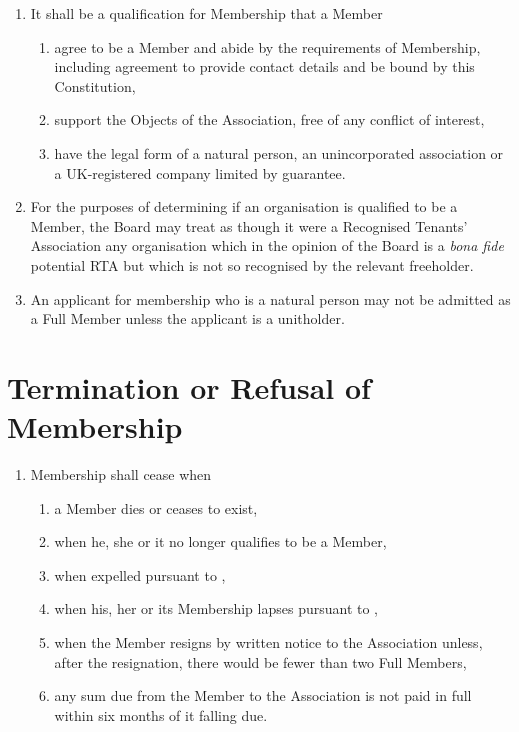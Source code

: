 \documentclass[10pt]{mk-articles-of-association}
\newcommand{\mysection}[1]{
  \end{enumerate}
  \section*{#1}
  \begin{enumerate}[resume]
}
\newcommand{\EC}[0]{Board}
\newcommand{\Exec}[0]{\EC{} }
\newcommand{\RTA}[0]{Recognised Tenants' Association}
\begin{document}
\begin{enumerate}
  \item It shall be a qualification for Membership that a Member
    \begin{enumerate}

    \item agree to be a Member and abide by the requirements of
      Membership, including agreement to provide contact details and
      be bound by this Constitution,

    \item support the Objects of the Association, free of any conflict
      of interest, \ITand

    \item have the legal form of a natural person, an unincorporated
      association or a UK-registered company limited by guarantee.

    \end{enumerate}

  \item For the purposes of determining if an organisation is
    qualified to be a Member, the \Exec may treat as though it were a
    \RTA{} any organisation which in the opinion of the \Exec is a
    \textit{bona fide} potential RTA but which is not so recognised by
    the relevant freeholder.

  \item An applicant for membership who is a natural person may not be
    admitted as a Full Member unless the applicant is a unitholder.

\mysection{Termination or Refusal of Membership}

  \item
    Membership shall cease when
    \begin{enumerate}
      \item a Member dies or ceases to exist,
      \item when he, she or it no longer qualifies to be a Member,
      \item when expelled pursuant to ,
      \item when his, her or its Membership lapses pursuant to
        ,
      \item when the Member resigns by written notice to the
        Association unless, after the resignation, there would be
        fewer than two Full Members, \ITor{}
      \item any sum due from the Member to the Association is not paid in full
        within six months of it falling due.
    \end{enumerate}


\end{enumerate}
\end{document}
